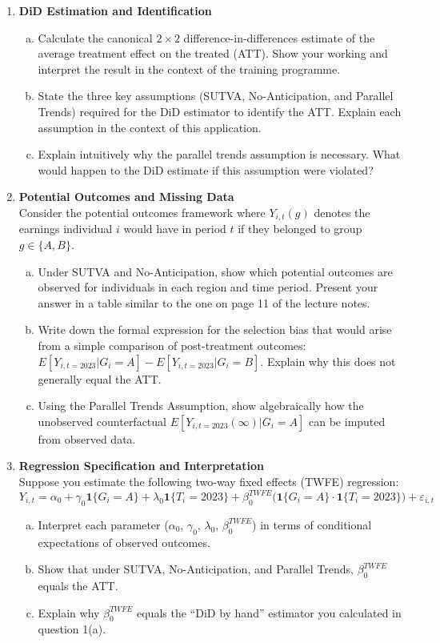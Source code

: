 \documentclass[12pt,a4paper]{article}
\begin{document}
\begin{enumerate}
\item \textbf{DiD Estimation and Identification}
\begin{enumerate}[(a)]
\item Calculate the canonical $2\times2$ difference-in-differences estimate of the average treatment effect on the treated (ATT). Show your working and interpret the result in the context of the training programme.
\item State the three key assumptions (SUTVA, No-Anticipation, and Parallel Trends) required for the DiD estimator to identify the ATT. Explain each assumption in the context of this application.
\item Explain intuitively why the parallel trends assumption is necessary. What would happen to the DiD estimate if this assumption were violated?
\end{enumerate}

\item \textbf{Potential Outcomes and Missing Data}\\
Consider the potential outcomes framework where $Y_{i,t}(g)$ denotes the earnings individual $i$ would have in period $t$ if they belonged to group $g \in \{A, B\}$.
\begin{enumerate}[(a)]
\item Under SUTVA and No-Anticipation, show which potential outcomes are observed for individuals in each region and time period. Present your answer in a table similar to the one on page 11 of the lecture notes.
\item Write down the formal expression for the selection bias that would arise from a simple comparison of post-treatment outcomes: $E[Y_{i,t=2023}|G_i = A] - E[Y_{i,t=2023}|G_i = B]$. Explain why this does not generally equal the ATT.
\item Using the Parallel Trends Assumption, show algebraically how the unobserved counterfactual $E[Y_{i,t=2023}(\infty)|G_i = A]$ can be imputed from observed data.
\end{enumerate}

\item \textbf{Regression Specification and Interpretation}\\
Suppose you estimate the following two-way fixed effects (TWFE) regression:
\begin{equation*}
Y_{i,t} = \alpha_{0}+\gamma_{0}\mathbf{1}\{G_i = A\}+\lambda_{0}\mathbf{1}\{T_i = 2023\}+\beta_{0}^{TWFE}\big(\mathbf{1}\{G_i = A\}\cdot\mathbf{1}\{T_i = 2023\}\big)+\varepsilon_{i,t}
\end{equation*}
\begin{enumerate}[(a)]
\item Interpret each parameter ($\alpha_{0}$, $\gamma_{0}$, $\lambda_{0}$, $\beta_{0}^{TWFE}$) in terms of conditional expectations of observed outcomes.
\item Show that under SUTVA, No-Anticipation, and Parallel Trends, $\beta_{0}^{TWFE}$ equals the ATT.
\item Explain why $\beta_{0}^{TWFE}$ equals the ``DiD by hand'' estimator you calculated in question 1(a).
\end{enumerate}

\end{enumerate}
\end{document}
